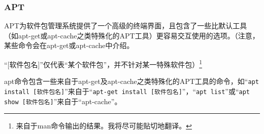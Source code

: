 \subsubsection{APT}
\cite{manAPT}\par
APT为软件包管理系统提供了一个高级的终端界面，且包含了一些比默认工具（如apt-get或apt-cache之类特殊化的APT工具）更容易交互使用的选项。（注意，某些命令会在apt-get或apt-cache中介绍。 \par “[软件包名]”仅代表“某个软件包”，并不针对某一特殊软件包）\footnote{来自于man命令输出的结果。我将尽可能贴切地翻译。 }\par apt命令包含一些来自于apt-get及apt-cache之类特殊化的APT工具的命令，如“\verb|apt install [软件包名]|”来自于“\verb|apt-get install [软件包名]|”，“\verb|apt list|”或“\verb|apt show [软件包名]|”来自于“apt-cache”。\par
